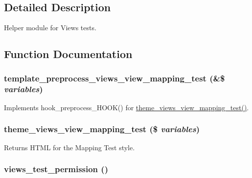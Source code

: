 \subsection{Detailed Description}
Helper module for Views tests. 

\subsection{Function Documentation}
\hypertarget{views__test_8module_ae1d29e3e940b012ae0a23c2903688372}{
\subsubsection[{template\_\-preprocess\_\-views\_\-view\_\-mapping\_\-test}]{\setlength{\rightskip}{0pt plus 5cm}template\_\-preprocess\_\-views\_\-view\_\-mapping\_\-test (\&\$ {\em variables})}}
\label{views__test_8module_ae1d29e3e940b012ae0a23c2903688372}
Implements hook\_\-preprocess\_\-HOOK() for \hyperlink{views__test_8module_ac1289dbbc1036d5221dfaf5189fb7251}{theme\_\-views\_\-view\_\-mapping\_\-test()}. \hypertarget{views__test_8module_ac1289dbbc1036d5221dfaf5189fb7251}{
\subsubsection[{theme\_\-views\_\-view\_\-mapping\_\-test}]{\setlength{\rightskip}{0pt plus 5cm}theme\_\-views\_\-view\_\-mapping\_\-test (\$ {\em variables})}}
\label{views__test_8module_ac1289dbbc1036d5221dfaf5189fb7251}
Returns HTML for the Mapping Test style. \hypertarget{views__test_8module_a5768b933d9689c113d322f2904be336a}{
\subsubsection[{views\_\-test\_\-permission}]{\setlength{\rightskip}{0pt plus 5cm}views\_\-test\_\-permission ()}}
